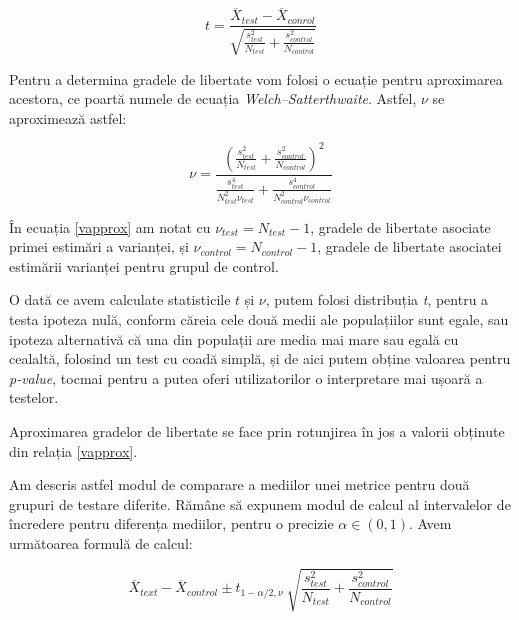 \begin{equation}
\label{tstatistic}
	t = \frac{\overline{X}_{test} - \overline{X}_{conrol}}{
		\sqrt{ {\frac{s_{test}^2}{N_{test}} }+ {\frac{s_{control}^2}{N_{control}}}}
		}
\end{equation}

\vspace{0.8cm}

Pentru a determina gradele de libertate vom folosi o ecuație pentru aproximarea acestora, ce poartă numele de ecuația \textit{Welch–Satterthwaite}\cite{Welch1947}. Astfel, $\nu$ se aproximează astfel:

\begin{equation}
\label{vapprox}
\nu = \frac{({\frac{s_{test}^2}{N_{test}} }+ {\frac{s_{control}^2}{N_{control}}}) ^ 2}{
	\frac{s_{test}^4}{N_{test}^2 \nu_{test}} + 
	\frac{s_{control}^4}{N_{control}^2 \nu_{control}}
}
\end{equation}

\vspace{0.8cm}

În ecuația \ref{vapprox} am notat cu $\nu_{test} = N_{test} - 1$, gradele de libertate asociate primei estimări a varianței,  și $\nu_{control} = N_{control} - 1$, gradele de libertate asociatei estimării varianței pentru grupul de control.

O dată ce avem calculate statisticile $t$ și $\nu$, putem folosi distribuția \textit{t}, pentru a testa ipoteza nulă, conform căreia cele două medii ale populațiilor sunt egale, sau ipoteza alternativă că una din populații are media mai mare sau egală cu cealaltă, folosind un test cu coadă simplă, și de aici putem obține valoarea pentru \textit{p-value}, tocmai pentru a putea oferi utilizatorilor o interpretare mai ușoară a testelor.

\begin{remark}
	Aproximarea gradelor de libertate se face prin rotunjirea în jos a valorii obținute din relația \ref{vapprox}.
\end{remark}

Am descris astfel modul de comparare a mediilor unei metrice pentru două grupuri de testare diferite. Rămâne să expunem modul de calcul al intervalelor de încredere pentru diferența mediilor, pentru o precizie $\alpha \in (0, 1)$. Avem următoarea formulă de calcul: \cite{miao}

\begin{equation}
\label{interval}
\overline{X}_{text} - \overline{X}_{control} \pm t_{1 - \alpha/2, \nu} \
\sqrt{ {\frac{s_{test}^2}{N_{test}} }+ {\frac{s_{control}^2}{N_{control}}}}
\end{equation}

